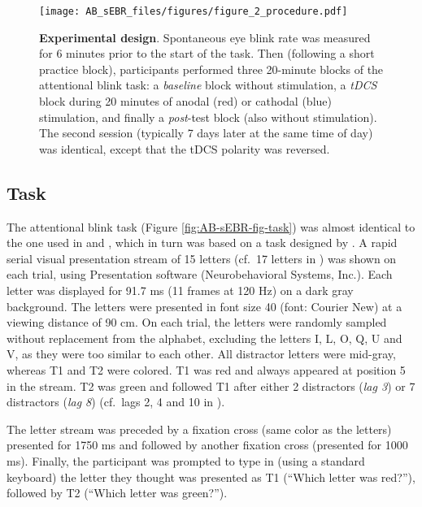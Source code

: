 \documentclass[11pt,]{memoir}
\begin{document}
\begin{figure}
\centering
\texttt{[image: AB\_sEBR\_files/figures/figure\_2\_procedure.pdf]}
\caption{\label{fig:AB-sEBR-fig-procedure}\textbf{Experimental design}. Spontaneous eye blink rate was measured for 6 minutes prior to the start of the task. Then (following a short practice block), participants performed three 20-minute blocks of the attentional blink task: a \emph{baseline} block without stimulation, a \emph{tDCS} block during 20 minutes of anodal (red) or cathodal (blue) stimulation, and finally a \emph{post}-test block (also without stimulation). The second session (typically 7 days later at the same time of day) was identical, except that the tDCS polarity was reversed.}
\end{figure}



\hypertarget{AB_sEBR-task}{%
\subsection{Task}\label{AB_sEBR-task}}

The attentional blink task (Figure \ref{fig:AB-sEBR-fig-task}) was almost identical to the one used in \textcite{London2015} and \textcite{Slagter2013}, which in turn was based on a task designed by \textcite{Dux2008}. A rapid serial visual presentation stream of 15 letters (cf.~17 letters in \textcite{London2015}) was shown on each trial, using Presentation software (Neurobehavioral Systems, Inc.). Each letter was displayed for 91.7 ms (11 frames at 120 Hz) on a dark gray background. The letters were presented in font size 40 (font: Courier New) at a viewing distance of 90 cm. On each trial, the letters were randomly sampled without replacement from the alphabet, excluding the letters I, L, O, Q, U and V, as they were too similar to each other. All distractor letters were mid-gray, whereas T1 and T2 were colored. T1 was red and always appeared at position 5 in the stream. T2 was green and followed T1 after either 2 distractors (\emph{lag 3}) or 7 distractors (\emph{lag 8}) (cf.~lags 2, 4 and 10 in \textcite{London2015}).

The letter stream was preceded by a fixation cross (same color as the letters) presented for 1750 ms and followed by another fixation cross (presented for 1000 ms). Finally, the participant was prompted to type in (using a standard keyboard) the letter they thought was presented as T1 (``Which letter was red?''), followed by T2 (``Which letter was green?'').
\end{document}
